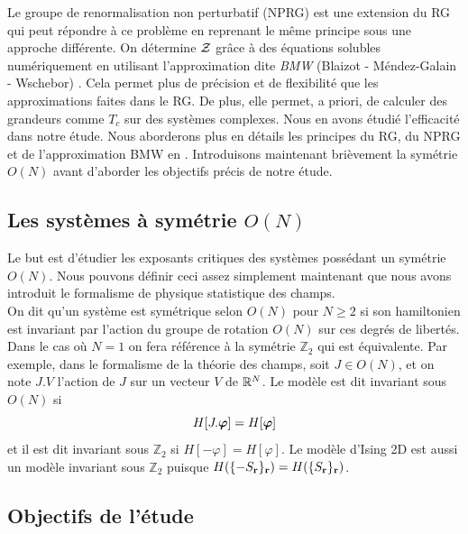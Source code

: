\documentclass[10.5pt]{article}
\begin{document}
\begin{multicols*}{2}
Le groupe de renormalisation non perturbatif (NPRG) est une extension du RG qui peut répondre à ce problème en reprenant le même principe sous une approche différente. On détermine $\mathcal{Z}$ grâce à des équations solubles numériquement en utilisant l'approximation dite \textit{BMW} (Blaizot - Méndez-Galain - Wschebor) \cite{Blaizot}. Cela permet plus de précision et de flexibilité que les approximations faites dans le RG. De plus, elle permet, a priori, de calculer des grandeurs comme $T_c$ sur des systèmes complexes. Nous en avons étudié l'efficacité dans notre étude. Nous aborderons plus en détails les principes du RG, du NPRG et de l'approximation BMW en . Introduisons maintenant brièvement la symétrie $O(N)$ avant d'aborder les objectifs précis de notre étude.


\subsection{Les systèmes à symétrie $O(N)$}

\label{sec:ON}

Le but est d'étudier les exposants critiques des systèmes possédant un symétrie $O(N)$. Nous pouvons définir ceci assez simplement maintenant que nous avons introduit le formalisme de physique statistique des champs. \\
 
On dit qu'un système est symétrique selon $O(N)$ pour $N \ge2 $ si son hamiltonien est invariant par l'action du groupe de rotation $O(N)$ sur ces degrés de libertés. Dans le cas où $N=1$ on fera référence à la symétrie $\mathbb{Z}_2$ qui est équivalente. Par exemple, dans le formalisme de la théorie des champs, soit $J \in O(N)$, et on note $J.V$ l'action de $J$ sur un vecteur $V$ de $\mathbb{R}^N$. Le modèle est dit invariant sous $O(N)$ si 
\begin{equation}
	H[J .\boldsymbol{ \varphi}] = H[\boldsymbol{ \varphi}]	 
\end{equation}
et il est dit invariant sous $\mathbb{Z}_2$ si $H[-\varphi] = H[\varphi]$. Le modèle d'Ising 2D est aussi un modèle invariant sous $\mathbb{Z}_2$ puisque $H( \{-S_{\bf r}\}_{\bf r}) = H( \{S_{\bf r}\}_{\bf r})$.

\vspace*{11pt}


\subsection{Objectifs de l'étude}



\end{multicols*}
\end{document}
